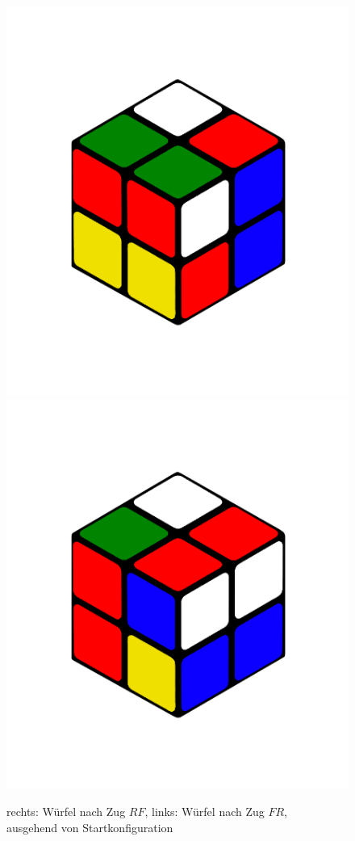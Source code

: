 \documentclass[12pt,a4paper, usenames, dvipsnames]{article}
\begin{document}
\begin{figure}[h]
\centering
\includegraphics[scale=0.1]{RF.png}
\includegraphics[scale=0.1]{FR.png}
\caption{rechts: Würfel nach Zug $RF$, links: Würfel nach Zug $FR$, \\ ausgehend von Startkonfiguration}
\end{figure} \ \\
\end{document}
